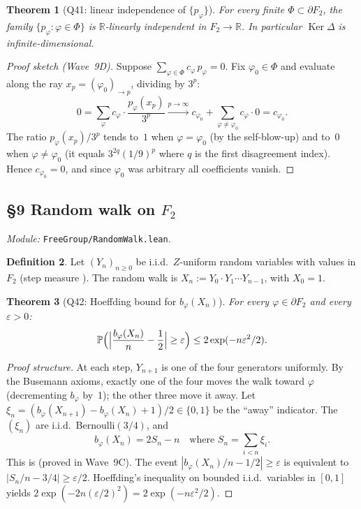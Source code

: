 \documentclass[11pt,a4paper]{article}
\newcommand{\lmod}[1]{\texttt{\small #1}}
\newcommand{\R}{\mathbb{R}}
\newcommand{\Ker}{\operatorname{Ker}}
\newcommand{\BFG}{\partial F_2}
\newcommand{\busem}{b}
\newcommand{\poiss}{p}
\theoremstyle{plain}
\newtheorem{theorem}{Theorem}[section]
\theoremstyle{definition}
\newtheorem{definition}[theorem]{Definition}
\begin{document}
\begin{theorem}[Q41: linear independence of $\{\poiss_\varphi\}$]\label{thm:Q41}
For every finite $\Phi \subset \BFG$, the family
$\{\poiss_\varphi : \varphi \in \Phi\}$ is $\R$-linearly independent
in $F_2 \to \R$. In particular $\Ker\Delta$ is infinite-dimensional.
\end{theorem}

\begin{proof}[Proof sketch (Wave~9D)]
Suppose $\sum_{\varphi \in \Phi} c_\varphi\, \poiss_\varphi = 0$.
Fix $\varphi_0 \in \Phi$ and evaluate along the ray
$x_p = (\varphi_0)_{\to p}$, dividing by $3^p$:
\[
0 = \sum_\varphi c_\varphi \cdot \frac{\poiss_\varphi(x_p)}{3^p}
\xrightarrow{p \to \infty}
c_{\varphi_0} + \sum_{\varphi \neq \varphi_0} c_\varphi \cdot 0
= c_{\varphi_0}.
\]
The ratio $\poiss_\varphi(x_p)/3^p$ tends to~$1$ when $\varphi = \varphi_0$
(by the self-blow-up) and to~$0$ when $\varphi \neq \varphi_0$
(it equals $3^{2q}(1/9)^p$ where $q$ is the first disagreement index).
Hence $c_{\varphi_0} = 0$, and since $\varphi_0$ was arbitrary all
coefficients vanish.
\end{proof}

\subsection{\S9 Random walk on \texorpdfstring{$F_2$}{F\_2}}
\emph{Module:} \lmod{FreeGroup/RandomWalk.lean}.

\begin{definition}
Let $(Y_n)_{n \geq 0}$ be i.i.d.\ $Z$-uniform random variables with
values in $F_2$ (step measure
). The
random walk is
$X_n := Y_0 \cdot Y_1 \cdots Y_{n-1}$, with $X_0 = 1$.
\end{definition}

\begin{theorem}[Q42: Hoeffding bound for $\busem_\varphi(X_n)$]
For every $\varphi \in \BFG$ and every $\varepsilon > 0$:
\[
\mathbb P\Bigl(\Bigl|\frac{\busem_\varphi(X_n)}{n} - \frac12\Bigr| \geq \varepsilon\Bigr)
\leq 2 \exp(-n \varepsilon^2 / 2).
\]
\end{theorem}

\begin{proof}[Proof structure]
At each step, $Y_{n+1}$ is one of the four generators uniformly. By
the Busemann axioms, exactly one of the four moves the walk toward
$\varphi$ (decrementing $\busem_\varphi$ by~1); the other three move it
away. Let $\xi_n = (\busem_\varphi(X_{n+1}) - \busem_\varphi(X_n) + 1)/2
\in \{0, 1\}$ be the ``away'' indicator. The $(\xi_n)$ are i.i.d.\
Bernoulli$(3/4)$, and
\[ \busem_\varphi(X_n) = 2 S_n - n \quad \text{where }
   S_n = \sum_{i < n} \xi_i. \]
This is  (proved in Wave~9C).
The event $|\busem_\varphi(X_n)/n - 1/2| \geq \varepsilon$ is equivalent to
$|S_n/n - 3/4| \geq \varepsilon / 2$. Hoeffding's inequality on bounded i.i.d.\
variables in $[0,1]$ yields $2 \exp(-2n(\varepsilon/2)^2) = 2\exp(-n\varepsilon^2/2)$.
\end{proof}
\end{document}
